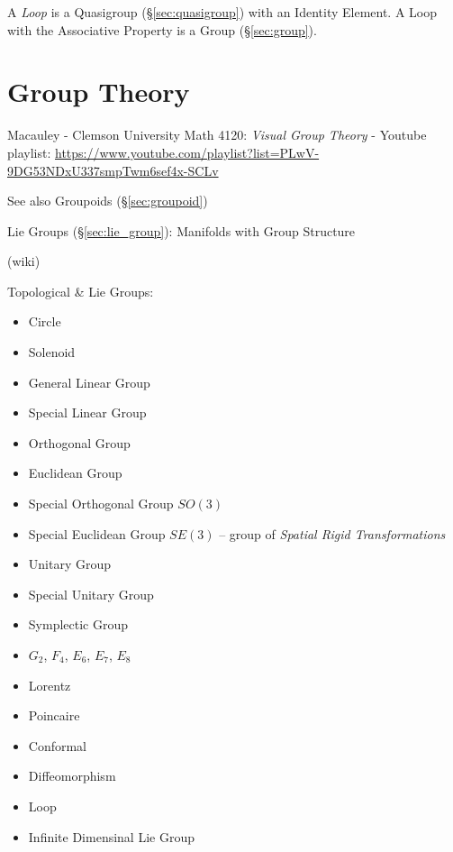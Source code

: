 A \emph{Loop} is a Quasigroup (\S\ref{sec:quasigroup}) with an
Identity Element. A Loop with the Associative Property is a Group
(\S\ref{sec:group}).



\section{Group Theory}\label{sec:group_theory}

Macauley - Clemson University Math 4120: \emph{Visual Group Theory} - Youtube
playlist:
\url{https://www.youtube.com/playlist?list=PLwV-9DG53NDxU337smpTwm6sef4x-SCLv}

\fist See also Groupoids (\S\ref{sec:groupoid})

\fist Lie Groups (\S\ref{sec:lie_group}): Manifolds with Group Structure

(wiki)

Topological \& Lie Groups:
\begin{itemize}
  \item Circle
  \item Solenoid
  \item General Linear Group
  \item Special Linear Group
  \item Orthogonal Group
  \item Euclidean Group
  \item Special Orthogonal Group $SO(3)$
  \item Special Euclidean Group $SE(3)$ -- group of \emph{Spatial Rigid
    Transformations}
  \item Unitary Group
  \item Special Unitary Group
  \item Symplectic Group
  \item $G_2$, $F_4$, $E_6$, $E_7$, $E_8$
  \item Lorentz
  \item Poincaire
  \item Conformal
  \item Diffeomorphism
  \item Loop
  \item Infinite Dimensinal Lie Group
\end{itemize}




